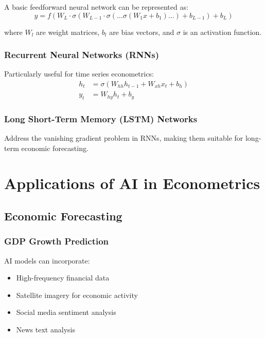 \documentclass[12pt,a4paper]{article}
\begin{document}
A basic feedforward neural network can be represented as:
\begin{equation}
y = f(W_L \cdot \sigma(W_{L-1} \cdot \sigma(\ldots \sigma(W_1 x + b_1) \ldots) + b_{L-1}) + b_L)
\end{equation}

where $W_l$ are weight matrices, $b_l$ are bias vectors, and $\sigma$ is an activation function.

\subsubsection{Recurrent Neural Networks (RNNs)}

Particularly useful for time series econometrics:
\begin{align}
h_t &= \sigma(W_{hh} h_{t-1} + W_{xh} x_t + b_h) \\
y_t &= W_{hy} h_t + b_y
\end{align}

\subsubsection{Long Short-Term Memory (LSTM) Networks}

Address the vanishing gradient problem in RNNs, making them suitable for long-term economic forecasting.

\section{Applications of AI in Econometrics}

\subsection{Economic Forecasting}

\subsubsection{GDP Growth Prediction}

AI models can incorporate:
\begin{itemize}
    \item High-frequency financial data
    \item Satellite imagery for economic activity
    \item Social media sentiment analysis
    \item News text analysis
\end{itemize}
\end{document}
